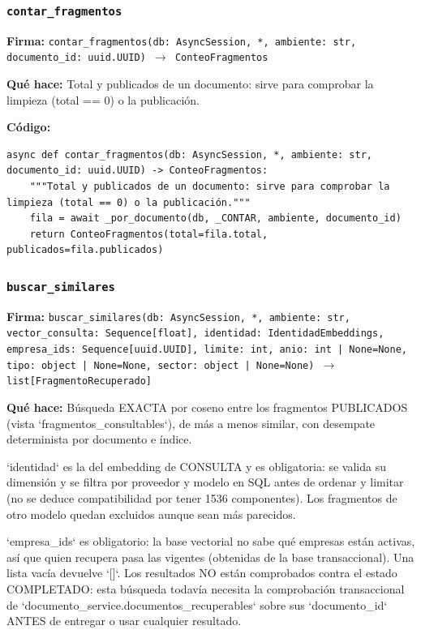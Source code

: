 \documentclass[11pt,a4paper]{article}
\begin{document}
\subsubsection*{\texttt{contar\_fragmentos}}
\textbf{Firma:} \texttt{contar\_fragmentos(db: AsyncSession, *, ambiente: str, documento\_id: uuid.UUID) $\rightarrow$ ConteoFragmentos}

\textbf{Qué hace:} Total y publicados de un documento: sirve para comprobar la limpieza (total == 0) o la publicación.

\textbf{Código:}
\begin{lstlisting}
async def contar_fragmentos(db: AsyncSession, *, ambiente: str, documento_id: uuid.UUID) -> ConteoFragmentos:
    """Total y publicados de un documento: sirve para comprobar la limpieza (total == 0) o la publicación."""
    fila = await _por_documento(db, _CONTAR, ambiente, documento_id)
    return ConteoFragmentos(total=fila.total, publicados=fila.publicados)
\end{lstlisting}

\subsubsection*{\texttt{buscar\_similares}}
\textbf{Firma:} \texttt{buscar\_similares(db: AsyncSession, *, ambiente: str, vector\_consulta: Sequence[float], identidad: IdentidadEmbeddings, empresa\_ids: Sequence[uuid.UUID], limite: int, anio: int | None=None, tipo: object | None=None, sector: object | None=None) $\rightarrow$ list[FragmentoRecuperado]}

\textbf{Qué hace:} Búsqueda EXACTA por coseno entre los fragmentos PUBLICADOS (vista `fragmentos\_consultables`),
de más a menos similar, con desempate determinista por documento e índice.

`identidad` es la del embedding de CONSULTA y es obligatoria: se valida su dimensión y se filtra por
proveedor y modelo en SQL antes de ordenar y limitar (no se deduce compatibilidad por tener 1536
componentes). Los fragmentos de otro modelo quedan excluidos aunque sean más parecidos.

`empresa\_ids` es obligatorio: la base vectorial no sabe qué empresas están activas, así que quien
recupera pasa las vigentes (obtenidas de la base transaccional). Una lista vacía devuelve `[]`.
Los resultados NO están comprobados contra el estado COMPLETADO: esta búsqueda todavía necesita la
comprobación transaccional de `documento\_service.documentos\_recuperables` sobre sus `documento\_id`
ANTES de entregar o usar cualquier resultado.
\end{document}
